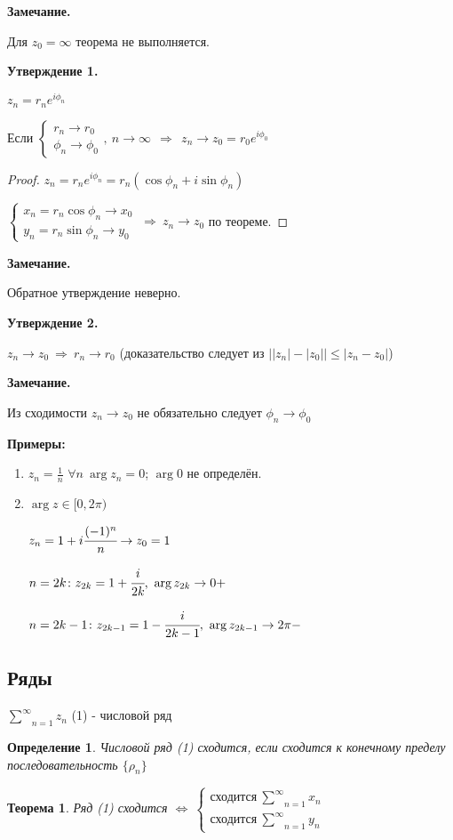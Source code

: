 \documentclass[draft]{report}
\newcommand{\then}{\ \Rightarrow\ }
\newcommand{\ind}[3]{\underset{#1}{\overset{#2}{#3}}}
\newcommand{\LRA}{\Leftrightarrow}
\renewcommand{\f}{\phi}
\newcommand{\sys}[1]{\left\{\begin{matrix}#1\end{matrix}\right.}
\newcommand{\opr}[1]{\begin{opred}#1\end{opred}}
\newtheorem*{theor}{Теорема}
\newtheorem*{opred}{Определение}
\theoremstyle{remark}
\begin{document}
{\bfseries Замечание.}

Для $z_0=\infty$ теорема не выполняется.

{\bfseries Утверждение 1.}

$z_n=r_ne^{i\f_n}$

Если $\sys{r_n\to r_0 \\ \f_n \to \f_0},\ n\to\infty\ \then\ z_n\to z_0=r_0e^{i\f_0}$

\begin{proof}
$z_n=r_ne^{i\f_n}=r_n(\cos\f_n+i\sin\f_n)$

$\sys{x_n=r_n\cos\f_n\to x_0 \\ y_n=r_n\sin\f_n\to y_0}\then z_n\to z_0$ по теореме.
\end{proof}

{\bfseries Замечание.}

Обратное утверждение неверно.

{\bfseries Утверждение 2.}

$z_n\to z_0\then r_n\to r_0$ (доказательство следует из $\bigl||z_n|-|z_0|\bigr|\leq|z_n-z_0|$)

{\bfseries Замечание.}

Из сходимости $z_n\to z_0$ не обязательно следует $\f_n\to\f_0$

{\bfseries Примеры:}
\begin{enumerate}
\item $z_n=\frac1n$ $\forall n\ \arg z_n=0$; $\arg 0$ не определён.
\item $\arg z\in[0,2\pi)$

$z_n=1+i\cfrac{(-1)^n}{n}\to z_0=1$

$n=2k\colon z_{2k}=1+\cfrac{i}{2k},\ \arg z_{2k}\to0+$

$n=2k-1\colon z_{2k-1}=1-\cfrac{i}{2k-1},\ \arg z_{2k-1}\to2\pi-$
\end{enumerate}

\subsection{Ряды}

$\ind{n=1}{\infty}{\sum}z_n$ (1) - числовой ряд

\opr{Числовой ряд (1) сходится, если сходится к конечному пределу последовательность $\{\rho_n\}$}

\begin{theor}
Ряд (1) сходится $\LRA\ \sys{\mbox{сходится}\ \ind{n=1}{\infty}{\sum}x_n \\ \mbox{сходится}\ \ind{n=1}{\infty}{\sum}y_n }$
\end{theor}
\end{document}
